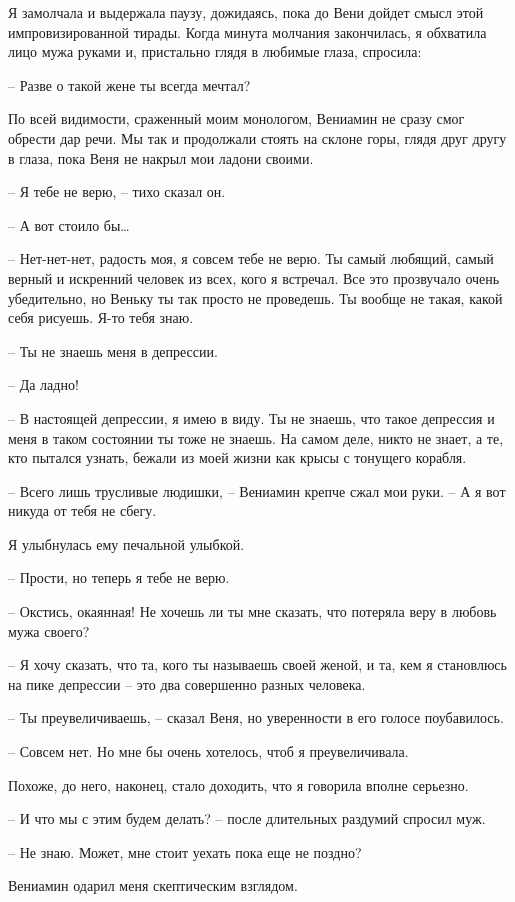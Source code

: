 \documentclass[
]{book}
\begin{document}
Я замолчала и выдержала паузу, дожидаясь, пока до Вени дойдет смысл этой импровизированной тирады. Когда минута молчания закончилась, я обхватила лицо мужа руками и, пристально глядя в любимые глаза, спросила:

-- Разве о такой жене ты всегда мечтал?

По всей видимости, сраженный моим монологом, Вениамин не сразу смог обрести дар речи. Мы так и продолжали стоять на склоне горы, глядя друг другу в глаза, пока Веня не накрыл мои ладони своими.

-- Я тебе не верю, -- тихо сказал он.

-- А вот стоило бы\ldots{}

-- Нет-нет-нет, радость моя, я совсем тебе не верю. Ты самый любящий, самый верный и искренний человек из всех, кого я встречал. Все это прозвучало очень убедительно, но Веньку ты так просто не проведешь. Ты вообще не такая, какой себя рисуешь. Я-то тебя знаю.

-- Ты не знаешь меня в депрессии.

-- Да ладно!

-- В настоящей депрессии, я имею в виду. Ты не знаешь, что такое депрессия и меня в таком состоянии ты тоже не знаешь. На самом деле, никто не знает, а те, кто пытался узнать, бежали из моей жизни как крысы с тонущего корабля.

-- Всего лишь трусливые людишки, -- Вениамин крепче сжал мои руки. -- А я вот никуда от тебя не сбегу.

Я улыбнулась ему печальной улыбкой.

-- Прости, но теперь я тебе не верю.

-- Окстись, окаянная! Не хочешь ли ты мне сказать, что потеряла веру в любовь мужа своего?

-- Я хочу сказать, что та, кого ты называешь своей женой, и та, кем я становлюсь на пике депрессии -- это два совершенно разных человека.

-- Ты преувеличиваешь, -- сказал Веня, но уверенности в его голосе поубавилось.

-- Совсем нет. Но мне бы очень хотелось, чтоб я преувеличивала.

Похоже, до него, наконец, стало доходить, что я говорила вполне серьезно.

-- И что мы с этим будем делать? -- после длительных раздумий спросил муж.

-- Не знаю. Может, мне стоит уехать пока еще не поздно?

Вениамин одарил меня скептическим взглядом.
\end{document}
